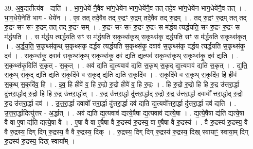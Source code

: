 \documentclass[17pt]{extarticle}
\begin{document}
39. अ॒व॒द्यतीत्य॑व - द्यति॑ । . भा॒ग॒धेये॑ नै॒वैव भा॑ग॒धेये॑न भाग॒धेये॑नै॒व तत् तदे॒व भा॑ग॒धेये॑न भाग॒धेये॑नै॒व तत् । . भा॒ग॒धेये॒नेति॑ भाग - धेये॑न । . ए॒व तत् तदे॒वैव तद् रु॒द्रꣳ रु॒द्रम् तदे॒वैव तद् रु॒द्रम् । . तद् रु॒द्रꣳ रु॒द्रम् तत् तद् रु॒द्रꣳ सꣳ सꣳ रु॒द्रम् तत् तद् रु॒द्रꣳ सम् । . रु॒द्रꣳ सꣳ सꣳ रु॒द्रꣳ रु॒द्रꣳ स म॑र्द्धय त्यर्द्धयति॒ सꣳ रु॒द्रꣳ रु॒द्रꣳ स म॑र्द्धयति । . स म॑र्द्धय त्यर्द्धयति॒ सꣳ स म॑र्द्धयति स॒कृथ्स॑कृथ् स॒कृथ्स॑कृ दर्द्धयति॒ सꣳ स म॑र्द्धयति स॒कृथ्स॑कृत् । . अ॒र्द्ध॒य॒ति॒ स॒कृथ्स॑कृथ् स॒कृथ्स॑कृ दर्द्धय त्यर्द्धयति स॒कृथ्स॑कृ॒ दवाव॑ स॒कृथ्स॑कृ दर्द्धय त्यर्द्धयति स॒कृथ्स॑कृ॒ दव॑ । . स॒कृथ्स॑कृ॒ दवाव॑ स॒कृथ्स॑कृथ् स॒कृथ्स॑कृ॒ दव॑ द्यति द्य॒त्यव॑ स॒कृथ्स॑कृथ् स॒कृथ्स॑कृ॒ दव॑ द्यति । . स॒कृथ्स॑कृ॒दिति॑ स॒कृत् - स॒कृ॒त् । . अव॑ द्यति द्य॒त्यवाव॑ द्यति स॒कृथ् स॒कृद् द्य॒त्यवाव॑ द्यति स॒कृत् । . द्य॒ति॒ स॒कृथ् स॒कृद् द्य॑ति द्यति स॒कृदि॑वे व स॒कृद् द्य॑ति द्यति स॒कृदि॑व । . स॒कृदि॑वे व स॒कृथ् स॒कृदि॑व॒ हि हीव॑ स॒कृथ् स॒कृदि॑व॒ हि । . इ॒व॒ हि हीवे॑ व॒ हि रु॒द्रो रु॒द्रो हीवे॑ व॒ हि रु॒द्रः । . हि रु॒द्रो रु॒द्रो हि हि रु॒द्र उ॑त्तरा॒र्द्धा दु॑त्तरा॒र्द्धाद् रु॒द्रो हि हि रु॒द्र उ॑त्तरा॒र्द्धात् । . रु॒द्र उ॑त्तरा॒र्द्धा दु॑त्तरा॒र्द्धाद् रु॒द्रो रु॒द्र उ॑त्तरा॒र्द्धा दवावो᳚ त्तरा॒र्द्धाद् रु॒द्रो रु॒द्र उ॑त्तरा॒र्द्धा दव॑ । . उ॒त्त॒रा॒र्द्धा दवावो᳚ त्तरा॒र्द्धा दु॑त्तरा॒र्द्धा दव॑ द्यति द्य॒त्यवो᳚त्तरा॒र्द्धा दु॑त्तरा॒र्द्धा दव॑ द्यति । . उ॒त्त॒रा॒र्द्धादित्यु॑त्तर - अ॒र्द्धात् । . अव॑ द्यति द्य॒त्यवाव॑ द्यत्ये॒षैषा द्य॒त्यवाव॑ द्यत्ये॒षा । . द्य॒त्ये॒षैषा द्य॑ति द्यत्ये॒षा वै वा ए॒षा द्य॑ति द्यत्ये॒षा वै । . ए॒षा वै वा ए॒षैषा वै रु॒द्रस्य॑ रु॒द्रस्य॒ वा ए॒षैषा वै रु॒द्रस्य॑ । . वै रु॒द्रस्य॑ रु॒द्रस्य॒ वै वै रु॒द्रस्य॒ दिग् दिग् रु॒द्रस्य॒ वै वै रु॒द्रस्य॒ दिक् । . रु॒द्रस्य॒ दिग् दिग् रु॒द्रस्य॑ रु॒द्रस्य॒ दिख् स्वायाꣳ॒॒ स्वाया॒म् दिग् रु॒द्रस्य॑ रु॒द्रस्य॒ दिख् स्वाया᳚म् । \newline
\pagebreak
{}
\end{document}
